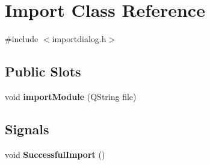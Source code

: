 \hypertarget{classImport}{
\section{Import Class Reference}
\label{classImport}
}


{\ttfamily \#include $<$importdialog.h$>$}

\subsection*{Public Slots}
\begin{DoxyCompactItemize}
\item 
\hypertarget{classImport_aa42f17e85fea0e76e1285c8fdf34054b}{
void {\bfseries importModule} (QString file)}
\label{classImport_aa42f17e85fea0e76e1285c8fdf34054b}

\end{DoxyCompactItemize}
\subsection*{Signals}
\begin{DoxyCompactItemize}
\item 
\hypertarget{classImport_a9e3e5edfb44bfac7f5a1c47aada4e4d7}{
void {\bfseries SuccessfulImport} ()}
\label{classImport_a9e3e5edfb44bfac7f5a1c47aada4e4d7}

\end{DoxyCompactItemize}
